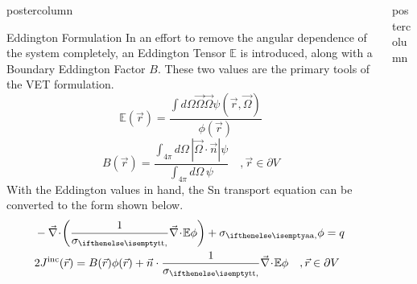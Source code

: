 \documentclass[xcolor={usenames,dvipsnames,svgnames,table}]{beamer}
\newcommand{\vr}{\vec{r}}
\newcommand{\vO}{\vec{\Omega}}
\newcommand{\bound}{\partial V}
\newcommand{\vn}{\vec{n}}
\newcommand{\Edd}{\mathbb{E}}
\newcommand{\BEdd}{B}
\newcommand{\scalSource}{q}
\newlength{\columnheight}
\begin{document}
\begin{frame}
\begin{columns}
\begin{column}{.33\textwidth}
\begin{beamercolorbox}[center,wd=\textwidth]{postercolumn}
\begin{minipage}[T]{0.95\textwidth}
{			    %
\begin{block}{Eddington Formulation}
In an effort to remove the angular dependence of the system completely, an Eddington Tensor $\Edd$ is introduced, along with a Boundary Eddington Factor $\BEdd$. These two values are the primary tools of the VET formulation.
\begin{equation}
\label{EddDef}
\Edd(\vr)=\frac{\int d\Omega \vO \vO \psi(\vr,\vO)}{\phi(\vr)}
\end{equation}
\begin{equation}
\BEdd(\vr) = \frac{\int_{4 \pi} d\Omega \, | \vO \cdot \vn | \psi}{\int_{4\pi} d\Omega \, \psi} \quad , \vr \in \bound 
\end{equation}
With the Eddington values in hand, the Sn transport equation can be converted to the form shown below. 
\begin{equation}
\label{VEFForm}
\begin{split}
&- \div \left( \frac{1}{\sigt}\div \Edd \phi \right) + \siga \phi = \scalSource \, \\
&2 J^{\text{inc}}(\vr) = \BEdd(\vr) \phi(\vr) + \vn \cdot \frac{1}{\sigt} \div \Edd \phi  \quad , \vr \in \bound \,\
\end{split}
\end{equation}

\end{block}
\vfill

			}
			\end{minipage}
		\end{beamercolorbox}
	\end{column}

	\begin{column}{.33\textwidth}
		\begin{beamercolorbox}[center,wd=\textwidth]{postercolumn}
			\begin{minipage}[T]{0.95\textwidth} %
			\parbox[t][\columnheight]{\textwidth}{ %


}
\end{minipage}
\end{beamercolorbox}
\end{column}
\end{columns}
\end{frame}
\end{document}
